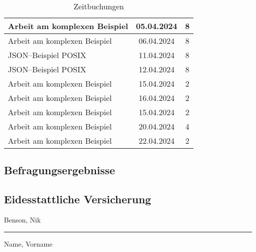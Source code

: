 \begin{table}[H]
\begin{tabular}{|l|c|c|}
        \hline
        Arbeit am komplexen Beispiel           & 05.04.2024 & 8              \\
        \hline
        Arbeit am komplexen Beispiel           & 06.04.2024 & 8              \\
        \hline
        \ac{JSON}--Beispiel \ac{POSIX}         & 11.04.2024 & 8              \\
        \hline
        \ac{JSON}--Beispiel \ac{POSIX}         & 12.04.2024 & 8              \\
        \hline
        Arbeit am komplexen Beispiel           & 15.04.2024 & 2              \\
        \hline
        Arbeit am komplexen Beispiel           & 16.04.2024 & 2              \\
        \hline
        Arbeit am komplexen Beispiel           & 15.04.2024 & 2              \\
        \hline
        Arbeit am komplexen Beispiel           & 20.04.2024 & 4              \\
        \hline
        Arbeit am komplexen Beispiel           & 22.04.2024 & 2              \\
        \hline
    \end{tabular}
    \caption{Zeitbuchungen}
    \label{tab:zeitbuchungen-long}
\end{table}

\subsection{Befragungsergebnisse}\label{appendix:befragungsergebnisse}




\subsection{Eidesstattliche Versicherung}\label{appendix:eidesstattliche-versicherung}
Benson, Nik\\
\rule[10pt]{\textwidth}{0.4pt}
{\small Name, Vorname}\\

\vspace{2cm}

